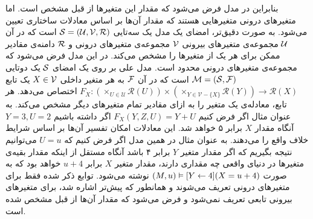 بنابراین در مدل فرض می‌شود که مقدار این متغیر‌ها از قبل مشخص است.
اما متغیر‌های درونی متغیرهایی هستند که مقدار آن‌ها بر اساس معادلات ساختاری تعیین می‌شود.
به صورت دقیق‌تر، امضای
یک مدل یک سه‌تایی
$\mathcal{S} = (\mathcal{U},\mathcal{V},\mathcal{R})$
است که در آن
$\mathcal{U}$
مجموعه‌ی متغیر‌های بیرونی
$\mathcal{V}$
مجموعه‌ی متغیر‌های درونی و
$\mathcal{R}$
دامنه‌ی مقادیر ممکن برای هر یک از متغیر‌ها را مشخص می‌کند.
در این مدل فرض می‌شود که مجموعه‌ی متغیر‌های درونی محدود است.
مدل علی بر روی یک امضای
$\mathcal{S}$
یک دوتایی
$\mathcal{M} = (\mathcal{S},\mathcal{F})$
است که در آن
$\mathcal{F}$
به هر متغیر داخلی
$X \in \mathcal{V}$
یک تابع
$F_X: (\times_{U\in \mathcal{U}}\mathcal{R}(U))\times (\times_{Y\in\mathcal{V}-\{X\}}\mathcal{R}(Y))\rightarrow \mathcal{R}(X)$
اختصاص می‌دهد.
هر تابع، معادله‌ی یک متغیر را به ازای مقادیر تمام متغیر‌های دیگر مشخص می‌کند.
به عنوان مثال اگر فرض کنیم
$F_X(Y,Z,U) = Y + U$
اگر داشته باشیم
$Y=3, U=2$
آنگاه مقدار
$X$
برابر ۵ خواهد شد.
این معادلات امکان تفسیر آن‌ها بر اساس شرایط خلاف واقع را می‌دهند.
به عنوان مثال در همین مدل اگر فرض کنیم که
$U=u$
می‌توانیم نتیجه بگیریم که اگر مقدار متغیر
$Y$
برابر ۴ باشد آنگاه مستقل از اینکه مقدار بقیه‌ی متغیر‌ها در دنیای واقعی چه مقداری دارند، مقدار متغیر
$X$
برابر
$u+4$
خواهد بود که به صورت
$(M,u) \vDash [Y \leftarrow 4](X = u + 4)$
نوشته می‌شود.
توابع ذکر شده فقط برای متغیر‌های درونی تعریف می‌شوند و همانطور که پیش‌تر اشاره شد، برای متغیرهای بیرونی تابعی تعریف نمی‌شود و فرض می‌شود که مقدار آن‌ها از قبل مشخص شده است.

